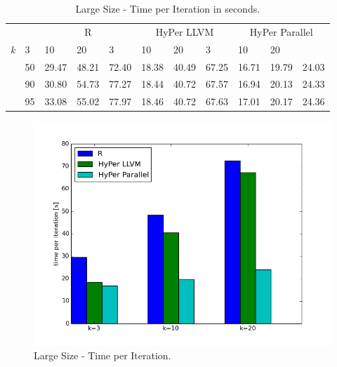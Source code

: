 \begin{table}[htsb]
  \caption[Large Size - Time per Iteration]{Large Size - Time per Iteration in seconds.}
  \label{tab:large_final}
  \centering
  \begin{tabular}{l l l l l |l l l |l l l }
    \toprule
      && \multicolumn{3}{c}{R} & \multicolumn{3}{c}{HyPer LLVM} & \multicolumn{3}{c}{HyPer Parallel}  \\
      \emph{k} & 3 & 10 & 20 & 3 & 10 & 20 & 3 & 10 & 20 \\
    \midrule
      \parbox[t]{2mm}{} &50  & 29.47 & 48.21 & 72.40 & 18.38 & 40.49 & 67.25 & 16.71 & 19.79 & 24.03 \\
      &90  & 30.80 & 54.73 & 77.27 & 18.44 & 40.72 & 67.57 & 16.94 & 20.13 & 24.33 \\
      &95  & 33.08 & 55.02 & 77.97 & 18.46 & 40.72 & 67.63 & 17.01 & 20.17 & 24.36 \\
    \bottomrule
  \end{tabular}
\end{table}




\begin{figure}[htsb]
  \centering
  \includegraphics[scale=0.5, trim="0cm 1.5cm 0cm 0cm"]{figures/charts/final_150M}
  \caption[Large Size - Time per Iteration]{Large Size - Time per Iteration.}
  \label{fig:final_150M}
\end{figure}


